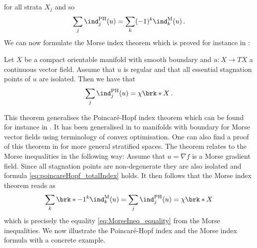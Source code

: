 for all strata $X_j$ and so
\begin{align}
  \sum_j\ind^{\text{PH}}_j(u)=\sum_k(-1)^k\ind^\text{M}_{k}(u)\,.\label{eq:poincareHopf_totalIndex}
\end{align}
We can now formulate the Morse index theorem which is proved for instance in \cite{Morse1929}:
\begin{theorem}
  Let $X$ be a compact orientable manifold with smooth boundary and $u\colon X\to TX$ a continuous vector field.
  Assume that $u$ is regular and that all essential stagnation points of $u$ are isolated.
  Then we have that
  \begin{align*}
    \sum_j\ind^{\text{PH}}_{j}(u)=\chi\brk*{X}\,.
  \end{align*}
\end{theorem}
This theorem generalises the Poincaré-Hopf index theorem which can be found for instance in \cite[§6]{Milnor1965}.
It has been generalised in \cite{Simsek2007} to manifolds with boundary for
Morse vector fields using terminology of convex optimisation.
One can also find a proof of this theorem in \cite{King2014} for more general stratified spaces.
The theorem relates to the Morse inequalities in the following way:
Assume that $u=\nabla f$ is a Morse gradient field.
Since all stagnation points are non-degenerate they are also isolated and
formula \eqref{eq:poincareHopf_totalIndex} holds. It then follows that the Morse index theorem reads as
\begin{align*}
  \sum_k\brk*{-1}^k\ind^\text{M}_{k}(u)=\sum_j\ind^{\text{PH}}_{j}(u)=\chi\brk*{X}
\end{align*} 
which is precisely the equality \eqref{eq:MorseIneq_equality} from the Morse inequalities.
We now illustrate the Poincaré-Hopf index and the Morse index formula with a concrete example.

